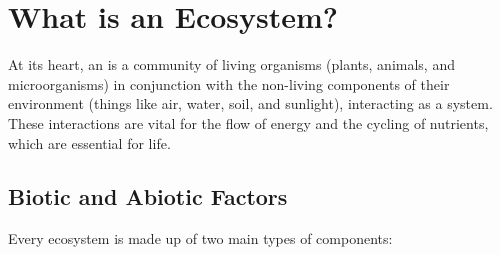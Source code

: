 \section{What is an Ecosystem?}

At its heart, an  is a community of living organisms (plants, animals, and microorganisms) in conjunction with the non-living components of their environment (things like air, water, soil, and sunlight), interacting as a system. These interactions are vital for the flow of energy and the cycling of nutrients, which are essential for life.

\subsection{Biotic and Abiotic Factors}

Every ecosystem is made up of two main types of components:


